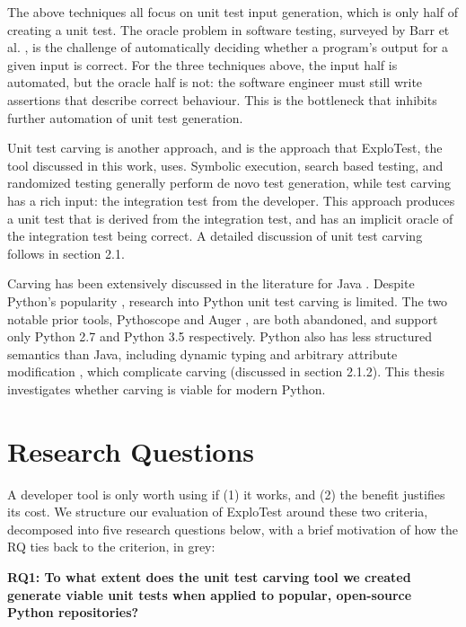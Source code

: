 The above techniques all focus on unit test input generation, which is only half of creating a unit test. The oracle
problem in software testing, surveyed by Barr et al. \cite{barr2014oracle}, is the challenge of automatically
deciding whether a program's output for a given input is correct. For the three techniques above, the input half is
automated, but the oracle half is not: the software engineer must still write assertions that describe correct
behaviour. This is the bottleneck that inhibits further automation of unit test generation.

Unit test carving is another approach, and is the approach that ExploTest, the tool discussed in this work, uses.
Symbolic execution, search based testing, and randomized testing generally perform de novo test generation,
while test carving has a rich input: the integration test from the developer. This approach produces a unit test
that is derived from the integration test, and has an implicit oracle of the integration test being correct. A detailed
discussion of unit test carving follows in section 2.1.

Carving has been extensively discussed in the literature for Java \cite{elbaum2006carving, elbaum2008carving, saff2004mock, saff2005automatic, deljouyi2023generating}.
Despite Python's popularity \cite{jansen2024tiobe}, research into Python unit test carving is limited. The two notable prior tools, Pythoscope \cite{wiatkowski2011pythoscope}
and Auger \cite{augerblogspot}, are both abandoned, and support only Python 2.7 and Python 3.5 respectively. Python also has less structured semantics than Java, including
dynamic typing and arbitrary attribute modification \cite{politz2013python}, which complicate carving (discussed in section 2.1.2). This thesis
investigates whether carving is viable for modern Python.

\section{Research Questions}
A developer tool is only worth using if (1) it works, and (2) the benefit justifies its cost.
We structure our evaluation of ExploTest around these two criteria, decomposed into five research questions below,
with a brief motivation of how the RQ ties back to the criterion, in grey:

\noindent\textbf{RQ1: To what extent does the unit test carving tool we created generate viable unit tests when applied to popular, open-source Python repositories?}

